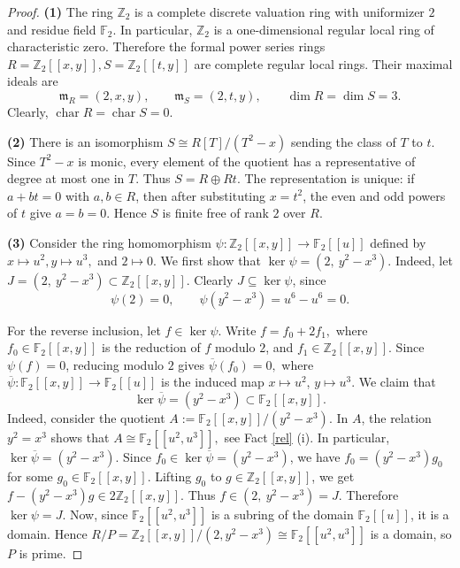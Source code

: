 \documentclass[10pt,a4paper]{amsart}
\theoremstyle{definition}
\theoremstyle{remark}
\begin{document}
\begin{proof}
	\textbf{(1) }
	The ring \(\mathbb Z_2\) is a complete discrete valuation ring with
	uniformizer \(2\) and residue field \(\mathbb F_2\). In particular,
	\(\mathbb Z_2\) is a one-dimensional regular local ring of
	characteristic zero. Therefore the formal power series rings
	\(
	R=\mathbb Z_2[[x,y]]
,
	S=\mathbb Z_2[[t,y]]
	\)
	are complete regular local rings. Their maximal ideals are
	\[
	\mathfrak m_R=(2,x,y),
	\qquad
	\mathfrak m_S=(2,t,y),
	 	\qquad 
	 	\dim R=\dim S=3.
	\]
	Clearly, 
	$\operatorname{char} R=\operatorname{char} S=0.
$
	
	\textbf{(2)}
	There is an isomorphism
	\(
	S\cong R[T]/(T^2-x)
	\)
	sending the class of \(T\) to \(t\). Since \(T^2-x\) is monic,
	every element of the quotient has a representative of degree at most
	one in \(T\). Thus
	\(
	S=R\oplus Rt.
	\)
	The representation is unique: if \(a+bt=0\) with \(a,b\in R\), then
	after substituting \(x=t^2\), the even and odd powers of \(t\) give
	\(a=b=0\). Hence \(S\) is finite free of rank \(2\) over \(R\).
	
	\textbf{(3)}
	Consider the ring homomorphism
$
	\psi:\mathbb Z_2[[x,y]]\to\mathbb F_2[[u]]
$
	defined by
	\(
	x\mapsto u^2, 
	y\mapsto u^3,
	\) and $2\mapsto 0$.
	We first show that
	\(
	\ker\psi=(2,\ y^2-x^3).
	\)
Indeed, let
	\(
	J=(2,\ y^2-x^3)\subset\mathbb Z_2[[x,y]].
	\)
	Clearly \(J\subseteq\ker\psi\), since
	\[
	\psi(2)=0,\qquad
	\psi(y^2-x^3)=u^6-u^6=0.
	\]
	
	For the reverse inclusion, let \(f\in\ker\psi\). Write
	\(
	f=f_0+2f_1,
	\)
	where \(f_0\in\mathbb F_2[[x,y]]\) is the reduction of \(f\) modulo
	\(2\), and \(f_1\in\mathbb Z_2[[x,y]]\). Since \(\psi(f)=0\), reducing
	modulo \(2\) gives
	\(
	\overline{\psi}(f_0)=0,
	\)
	where
	\(
	\overline{\psi}:\mathbb F_2[[x,y]]\to\mathbb F_2[[u]]
	\)
	is the induced map \(x\mapsto u^2\), \(y\mapsto u^3\).
	We claim that
	\[
	\ker\overline{\psi}=(y^2-x^3)\subset\mathbb F_2[[x,y]].
	\]
	Indeed, consider the quotient
	\(
	A:=\mathbb F_2[[x,y]]/(y^2-x^3).
	\)
	In \(A\),   the relation
	\(
	y^2=x^3 
	\)
	   shows that  
	\(
	A\cong\mathbb F_2[[u^2,u^3]],
	\) see {Fact} \ref{rel} (i).
 In particular,
	\(
	\ker\overline{\psi}=(y^2-x^3).
	\)
	Since \(f_0\in\ker\overline{\psi}=(y^2-x^3)\), we have
	\(
	f_0=(y^2-x^3)g_0
	\)
	for some \(g_0\in\mathbb F_2[[x,y]]\). Lifting \(g_0\) to
	\(g\in\mathbb Z_2[[x,y]]\), we get
	\(
	f-(y^2-x^3)g\in 2\mathbb Z_2[[x,y]].
	\)
	Thus
	\(
	f\in (2,\ y^2-x^3)=J.
	\)
	Therefore \(\ker\psi=J\).
	Now, since \(\mathbb F_2[[u^2,u^3]]\) is a subring of the domain
	\(\mathbb F_2[[u]]\), it is a domain. Hence
	\(
	R/P=\mathbb Z_2[[x,y]]/(2,y^2-x^3)
	\cong\mathbb F_2[[u^2,u^3]]
	\)
	is a domain, so \(P\) is prime.
	

\end{proof}
\end{document}
